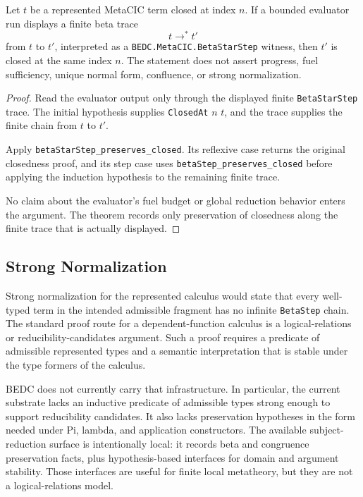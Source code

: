 \begin{theorem}
\label{thm:metacic-bounded-normalization-trace-closure}
Let $t$ be a represented MetaCIC term closed at index $n$. If a bounded evaluator run displays a finite beta trace
$$
t \to^{*} t'
$$
from $t$ to $t'$, interpreted as a \texttt{BEDC.MetaCIC.BetaStarStep} witness, then $t'$ is closed at the same index $n$. The statement does not assert progress, fuel sufficiency, unique normal form, confluence, or strong normalization.
\end{theorem}
\begin{proof}
Read the evaluator output only through the displayed finite \texttt{BetaStarStep} trace. The initial hypothesis supplies \texttt{ClosedAt} $n$ $t$, and the trace supplies the finite chain from $t$ to $t'$.

Apply \texttt{betaStarStep\_preserves\_closed}. Its reflexive case returns the original closedness proof, and its step case uses \texttt{betaStep\_preserves\_closed} before applying the induction hypothesis to the remaining finite trace.

No claim about the evaluator's fuel budget or global reduction behavior enters the argument. The theorem records only preservation of closedness along the finite trace that is actually displayed.
\end{proof}

\subsection{Strong Normalization}
\label{subsec:metacic-strong-normalization-open}

Strong normalization for the represented calculus would state that every
well-typed term in the intended admissible fragment has no infinite
\texttt{BetaStep} chain. The standard proof route for a dependent-function
calculus is a logical-relations or reducibility-candidates argument. Such a
proof requires a predicate of admissible represented types and a semantic
interpretation that is stable under the type formers of the calculus.

BEDC does not currently carry that infrastructure. In particular, the current
substrate lacks an inductive predicate of admissible types strong enough to
support reducibility candidates. It also lacks preservation hypotheses in the
form needed under Pi, lambda, and application constructors. The available
subject-reduction surface is intentionally local: it records beta and
congruence preservation facts, plus hypothesis-based interfaces for domain
and argument stability. Those interfaces are useful for finite local
metatheory, but they are not a logical-relations model.

